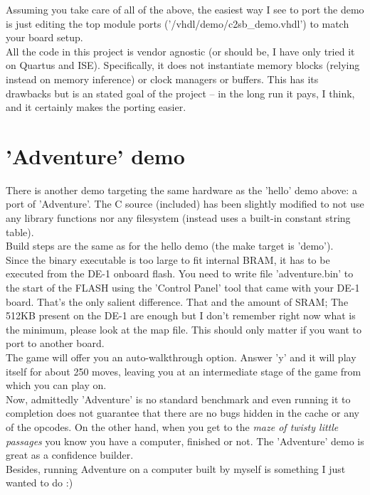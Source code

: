     Assuming you take care of all of the above, the easiest way I see to port
    the demo is just editing the top module ports ('/vhdl/demo/c2sb\_demo.vhdl')
    to match your board setup.\\

    All the code in this project is vendor agnostic (or should be, I have only
    tried it on Quartus and ISE). Specifically, it does not instantiate memory
    blocks (relying instead on memory inference) or clock managers or buffers.
    This has its drawbacks but is an stated goal of the project -- in the long
    run it pays, I think, and it certainly makes the porting easier.\\
    
\section{'Adventure' demo}
\label{adventure}

    There is another demo targeting the same hardware as the 'hello' demo above:
    a port of 'Adventure'. The C source (included) has been slightly modified
    to not use any library functions nor any filesystem (instead uses a built-in
    constant string table).\\
    
    Build steps are the same as for the hello demo (the make target is 'demo').\\
    
    Since the binary executable is too large to fit internal BRAM, it has to be 
    executed from the DE-1 onboard flash. You need to write file 'adventure.bin'
    to the start of the FLASH using the 'Control Panel' tool that came with your
    DE-1 board. That's the only salient difference. That and the amount of SRAM;
    The 512KB present on the DE-1 are enough but I don't remember right now
    what is the minimum, please look at the map file. This should only matter
    if you want to port to another board.\\
    
    The game will offer you an auto-walkthrough option. Answer 'y' and it will
    play itself for about 250 moves, leaving you at an intermediate stage of 
    the game from which you can play on.\\
    
    Now, admittedly 'Adventure' is no standard benchmark and even running it to 
    completion does not guarantee that there are no bugs hidden in the cache or 
    any of the opcodes.
    On the other hand, when you get to the \emph{maze of twisty little passages} 
    you know you have a computer, finished or not. The 'Adventure' demo is 
    great as a confidence builder.\\
    
    Besides, running Adventure on a computer built by myself is something 
    I just wanted to do :)\\
